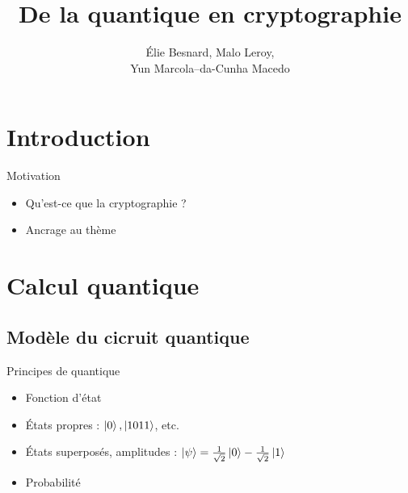\documentclass[french]{beamer}
\title{De la quantique en cryptographie}
\author{Élie Besnard, Malo Leroy, \\
Yun Marcola--da-Cunha Macedo}
\institute{Lycée Chateaubriand}
\begin{document}
\section{Introduction}

\begin{frame}
\titlepage
\end{frame}


\begin{frame}{Motivation}
\begin{itemize}
    \item<1-> Qu'est-ce que la cryptographie ?
    \item<2> Ancrage au thème
\end{itemize}
\end{frame}


\section{Calcul quantique}


\subsection{Modèle du cicruit quantique}


\begin{frame}{Principes de quantique}
\begin{itemize}
    \item<1-> Fonction d'état
    \item<2-> États propres : $\ket 0, \ket{1011}$, etc.
    \item<3-> États superposés, amplitudes : $\ket \psi = \frac{1}{\sqrt 2} \ket 0 - \frac{1}{\sqrt 2} \ket 1$
    \item<4> Probabilité
\end{itemize}
\end{frame}
\end{document}
